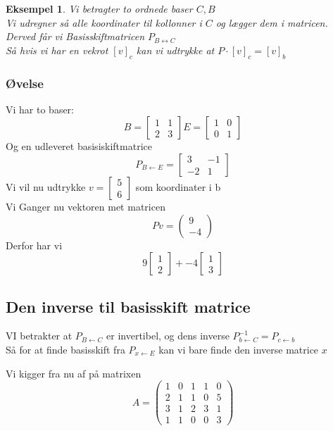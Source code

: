\documentclass[a4paper,fleqn]{report}
\newtheorem{example}{Eksempel}[chapter]
\begin{document}
	\begin{example}
	Vi betragter to ordnede baser $C, B$\\
	Vi udregner så alle koordinater til kollonner i $C$ og lægger dem i matricen. Derved får vi
	Basisskiftmatricen $P_{B \leftrightarrow C}$\\
	Så hvis vi har en vekrot $[v]_c$ kan vi udtrykke at $P\cdot[v]_c = [v]_b$
	\end{example}
	\subsubsection{Øvelse}
	Vi har to baser: \[ B =  \begin{bmatrix}1&1\\2&3\end{bmatrix} E = \begin{bmatrix}1&0\\0&1
	\end{bmatrix}\] Og en udleveret basisiskiftmatrice \[ P_{B \leftarrow E} = 
\begin{bmatrix}3&-1\\-2&1\end{bmatrix}\]
	Vi vil nu udtrykke $v = \begin{bmatrix}5\\6\end{bmatrix}$ som koordinater i b\\
	Vi Ganger nu vektoren met matricen\\
	\[Pv = \begin{pmatrix}9\\-4\end{pmatrix} \]
	Derfor har vi \[9\begin{bmatrix}1\\2\end{bmatrix} + -4\begin{bmatrix}1\\3\end{bmatrix}\]

	\subsection{Den inverse til basisskift matrice}
	VI betrakter at $P_{B \leftarrow C}$ er invertibel, og dens inverse $P_{b\leftarrow C}^{-1}
	= P_{c \leftarrow b}$\\
	Så for at finde basisskift fra $P_{x \leftarrow E}$ kan vi bare finde den inverse matrice
	$x$

	Vi kigger fra nu af på matrixen \[A = 
	\left(\begin{array}{rrrrr}
	1 & 0 & 1 & 1 & 0 \\
	2 & 1 & 1 & 0 & 5 \\
	3 & 1 & 2 & 3 & 1 \\
	1 & 1 & 0 & 0 & 3
	\end{array}\right)\]
\end{document}
